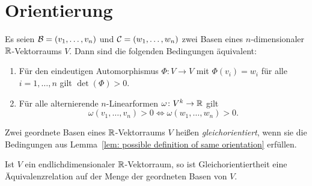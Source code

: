 \section{Orientierung}


\begin{lemma}\label{lem: possible definition of same orientation}
  Es seien $\mathcal{B} = (v_1, \dotsc, v_n)$ und $\mathcal{C} = (w_1, \dotsc, w_n)$ zwei Basen eines $n$-di\-men\-si\-o\-nal\-er $\mathbb{R}$-Vektorraums $V$.
  Dann sind die folgenden Bedingungen äquivalent:
  \begin{enumerate}[leftmargin=*, label=\roman*)]
    \item
      Für den eindeutigen Automorphismus $\Phi \colon V \to V$ mit $\Phi(v_i) = w_i$ für alle $i = 1, \dotsc, n$ gilt $\det(\Phi) > 0$.
    \item
      Für alle alternierende $n$-Linearformen $\omega \colon V^k \to \mathbb{R}$ gilt
      \[
        \omega(v_1, \dotsc, v_n) > 0
        \iff
        \omega(w_1, \dotsc, w_n) > 0.
      \]
  \end{enumerate}
\end{lemma}


\begin{definition}
  Zwei geordnete Basen eines $\mathbb{R}$-Vektorraums $V$ heißen \emph{gleichorientiert}, wenn sie die Bedingungen aus Lemma~\ref{lem: possible definition of same orientation} erfüllen.
\end{definition}


\begin{lemma}
  Ist $V$ ein endlichdimensionaler $\mathbb{R}$-Vektorraum, so ist Gleichorientiertheit eine Äquivalenzrelation auf der Menge der geordneten Basen von $V$.
\end{lemma}

